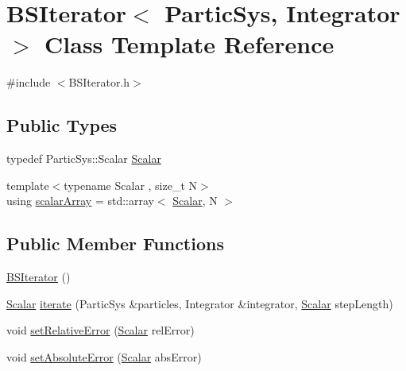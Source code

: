 \hypertarget{class_b_s_iterator}{}\section{B\+S\+Iterator$<$ Partic\+Sys, Integrator $>$ Class Template Reference}
\label{class_b_s_iterator}


{\ttfamily \#include $<$B\+S\+Iterator.\+h$>$}

\subsection*{Public Types}
\begin{DoxyCompactItemize}
\item 
typedef Partic\+Sys\+::\+Scalar \mbox{\hyperlink{class_b_s_iterator_a7857f8ff9032955ea4dcc22cd18ca7a1}{Scalar}}
\item 
{\footnotesize template$<$typename Scalar , size\+\_\+t N$>$ }\\using \mbox{\hyperlink{class_b_s_iterator_ab0aa7c10b56500273af05dcd85fd8389}{scalar\+Array}} = std\+::array$<$ \mbox{\hyperlink{class_b_s_iterator_a7857f8ff9032955ea4dcc22cd18ca7a1}{Scalar}}, N $>$
\end{DoxyCompactItemize}
\subsection*{Public Member Functions}
\begin{DoxyCompactItemize}
\item 
\mbox{\hyperlink{class_b_s_iterator_a144fb5c55fcd7bc873e73f4d06276fb2}{B\+S\+Iterator}} ()
\item 
\mbox{\hyperlink{class_b_s_iterator_a7857f8ff9032955ea4dcc22cd18ca7a1}{Scalar}} \mbox{\hyperlink{class_b_s_iterator_a5520642ecbd454fb1f4d9ece18dc4e3f}{iterate}} (Partic\+Sys \&particles, Integrator \&integrator, \mbox{\hyperlink{class_b_s_iterator_a7857f8ff9032955ea4dcc22cd18ca7a1}{Scalar}} step\+Length)
\item 
void \mbox{\hyperlink{class_b_s_iterator_ada9b6cc673e297135646699d581fcdc7}{set\+Relative\+Error}} (\mbox{\hyperlink{class_b_s_iterator_a7857f8ff9032955ea4dcc22cd18ca7a1}{Scalar}} rel\+Error)
\item 
void \mbox{\hyperlink{class_b_s_iterator_a57603539823be271c2229d0951b7d957}{set\+Absolute\+Error}} (\mbox{\hyperlink{class_b_s_iterator_a7857f8ff9032955ea4dcc22cd18ca7a1}{Scalar}} abs\+Error)
\end{DoxyCompactItemize}
